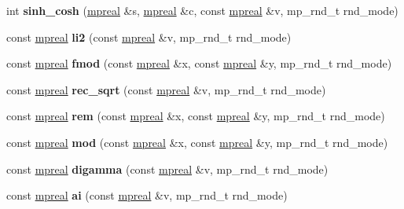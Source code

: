 \begin{DoxyCompactItemize}
int {\bfseries sinh\+\_\+cosh} (\hyperlink{classmpfr_1_1mpreal}{mpreal} \&s, \hyperlink{classmpfr_1_1mpreal}{mpreal} \&c, const \hyperlink{classmpfr_1_1mpreal}{mpreal} \&v, mp\+\_\+rnd\+\_\+t rnd\+\_\+mode)
\item 
\mbox{\label{classmpfr_1_1mpreal_a0eb0e188ac7b0c538c1517f754de5eed}} 
const \hyperlink{classmpfr_1_1mpreal}{mpreal} {\bfseries li2} (const \hyperlink{classmpfr_1_1mpreal}{mpreal} \&v, mp\+\_\+rnd\+\_\+t rnd\+\_\+mode)
\item 
\mbox{\label{classmpfr_1_1mpreal_a4c1a7ff6327558cf2fb2101f8c4ff2a2}} 
const \hyperlink{classmpfr_1_1mpreal}{mpreal} {\bfseries fmod} (const \hyperlink{classmpfr_1_1mpreal}{mpreal} \&x, const \hyperlink{classmpfr_1_1mpreal}{mpreal} \&y, mp\+\_\+rnd\+\_\+t rnd\+\_\+mode)
\item 
\mbox{\label{classmpfr_1_1mpreal_a8396cfa2553c7288137831e3237fcda5}} 
const \hyperlink{classmpfr_1_1mpreal}{mpreal} {\bfseries rec\+\_\+sqrt} (const \hyperlink{classmpfr_1_1mpreal}{mpreal} \&v, mp\+\_\+rnd\+\_\+t rnd\+\_\+mode)
\item 
\mbox{\label{classmpfr_1_1mpreal_a2461f52f3253c1e1e808f781f392164b}} 
const \hyperlink{classmpfr_1_1mpreal}{mpreal} {\bfseries rem} (const \hyperlink{classmpfr_1_1mpreal}{mpreal} \&x, const \hyperlink{classmpfr_1_1mpreal}{mpreal} \&y, mp\+\_\+rnd\+\_\+t rnd\+\_\+mode)
\item 
\mbox{\label{classmpfr_1_1mpreal_ac80a910222f72adb09d723f1a21f5a82}} 
const \hyperlink{classmpfr_1_1mpreal}{mpreal} {\bfseries mod} (const \hyperlink{classmpfr_1_1mpreal}{mpreal} \&x, const \hyperlink{classmpfr_1_1mpreal}{mpreal} \&y, mp\+\_\+rnd\+\_\+t rnd\+\_\+mode)
\item 
\mbox{\label{classmpfr_1_1mpreal_ab979e4a020c2fcb4cbd3dab29b3acf90}} 
const \hyperlink{classmpfr_1_1mpreal}{mpreal} {\bfseries digamma} (const \hyperlink{classmpfr_1_1mpreal}{mpreal} \&v, mp\+\_\+rnd\+\_\+t rnd\+\_\+mode)
\item 
\mbox{\label{classmpfr_1_1mpreal_a21d422bbf4e20ec2cbe3e2171255e795}} 
const \hyperlink{classmpfr_1_1mpreal}{mpreal} {\bfseries ai} (const \hyperlink{classmpfr_1_1mpreal}{mpreal} \&v, mp\+\_\+rnd\+\_\+t rnd\+\_\+mode)

\end{DoxyCompactItemize}
